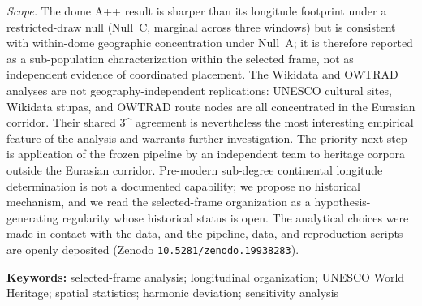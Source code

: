 \documentclass[12pt,a4paper]{article}
\let\origtextdegree\textdegree
\renewcommand{\textdegree}{\ifmmode^\circ\else\origtextdegree\fi}
\begin{document}
{\textit{Scope.} The dome A++ result is sharper than its longitude
footprint under a restricted-draw null (Null~C, marginal across three
windows) but is consistent with within-dome geographic concentration
under Null~A; it is therefore reported as a sub-population
characterization within the selected frame, not as independent evidence
of coordinated placement. The Wikidata and OWTRAD analyses are not
geography-independent replications: UNESCO cultural sites, Wikidata
stupas, and OWTRAD route nodes are all concentrated in the Eurasian
corridor. Their shared 3\textdegree{} agreement is nevertheless the
most interesting empirical feature of the analysis and warrants
further investigation. The priority next step is application of the
frozen pipeline by an independent team to heritage corpora outside the
Eurasian corridor. Pre-modern sub-degree continental longitude
determination is not a documented capability; we propose no historical
mechanism, and we read the selected-frame organization as a
hypothesis-generating regularity whose historical status is open. The
analytical choices were made in contact with the data, and the
pipeline, data, and reproduction scripts are openly deposited (Zenodo
\texttt{10.5281/zenodo.19938283}).
}

\bigskip

\noindent\textbf{Keywords:}
selected-frame analysis; longitudinal organization; UNESCO World
Heritage; spatial statistics; harmonic deviation; sensitivity analysis

\bigskip


\end{document}

